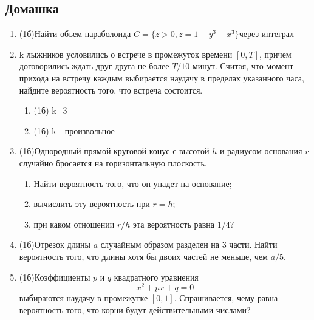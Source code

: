 \documentclass[a4paper, 14pt]{extarticle}
\begin{document}
\subsection*{Домашка}
\begin{enumerate}
    \item (1б)Найти объем параболоида $C = \{z>0,z = 1-y^3-x^3\}$через интеграл
	\item k лыжников условились о встрече в промежуток времени $[0,T]$, причем договорились
	ждать друг друга не более $T/10$ минут. Считая, что
	момент прихода на встречу каждым выбирается наудачу в пределах
	указанного часа, найдите вероятность того, что встреча состоится.
	\begin{enumerate}
	    \item (1б) k=3
	    \item (1б) k - произвольное
	\end{enumerate}
	\item (1б)Однородный прямой круговой конус с 
	высотой $h$ и радиусом основания $r$ случайно бросается на
	горизонтальную плоскость.
	\begin{enumerate}
		\item Найти вероятность того,
	что он упадет на основание; 
		\item вычислить эту 
	вероятность при $r=h$; 
	\item при каком отношении $r/h$ эта 
	вероятность равна 1/4?
\end{enumerate}
	
	\item (1б)Отрезок длины $a$ случайным образом разделен на 3 части. Найти вероятность того, что длины хотя бы двоих частей не меньше, чем $a/5$.
	\item (1б)Коэффициенты $p$ и $q$ квадратного уравнения
	$$x^2 + px + q = 0$$
	выбираются наудачу в промежутке $[0,1]$. Спрашивается, чему равна 
	вероятность того, что корни будут действительными числами?

\end{enumerate}
\end{document}
